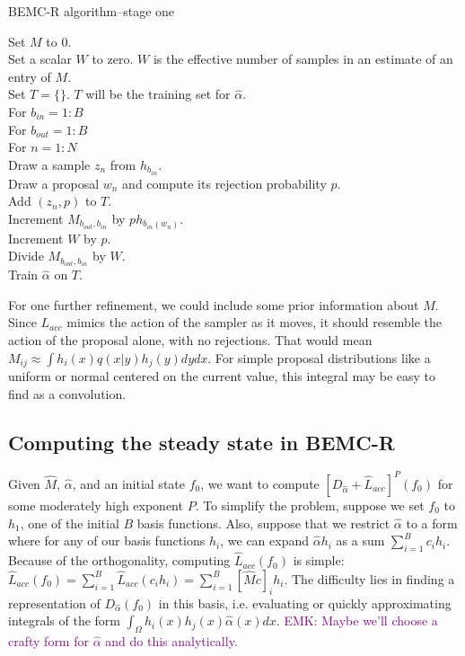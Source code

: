 \documentclass{article}
\newcommand\EMK[1]{\textcolor{purple}{EMK: #1}}
\begin{document}
\begin{algorithm}[h]
\caption{BEMC-R algorithm--stage one}
Set $M$ to $0$.\\ 
Set a scalar $W$ to zero. $W$ is the effective number of samples in an estimate of an entry of $M$.\\
Set $T = \{\}$. $T$ will be the training set for $\hat{\alpha}$.\\
For $b_{in}  = 1:B$\\
\Indp
For $b_{out}  = 1:B$\\
\Indp
For $n = 1:N$\\
\Indp
Draw a sample $z_n$ from $h_{b_{in}}$.\\
Draw a proposal $w_n$ and compute its rejection probability $p$.\\
Add $(z_n, p)$ to $T$.\\
Increment $M_{b_{out}, b_{in}}$ by $ph_{b_{in}(w_n)}$.\\
Increment $W$ by $p$.\\
\Indm
Divide $M_{b_{out}, b_{in}}$ by $W$.\\
\Indm
\Indm
Train $\hat{\alpha}$ on $T$.\\
\end{algorithm}

For one further refinement, we could include some prior information about $M$. Since $L_{acc}$ mimics the action of the sampler as it moves, it should resemble the action of the proposal alone, with no rejections. That would mean $M_{ij} \approx \int h_i(x)q(x|y)h_j(y)dydx$. For simple proposal distributions like a uniform or normal centered on the current value, this integral may be easy to find as a convolution.

\subsection{Computing the steady state in BEMC-R}
 Given $\hat{M}$, $\hat{\alpha}$, and an initial state $f_0$, we want to compute $[D_{\hat{\alpha}}+\hat{L}_{acc}]^P(f_0)$ for some moderately high exponent $P$. To simplify the problem, suppose we set $f_0$ to $h_1$, one of the initial $B$ basis functions. Also, suppose that we restrict $\hat{\alpha}$ to a form where for any of our basis functions $h_i$, we can expand $\hat{\alpha}h_i$ as a sum $\sum_{i=1}^B c_i h_i$. Because of the orthogonality, computing $\hat{L}_{acc}(f_0)$ is simple: $\hat{L}_{acc}(f_0) = \sum_{i=1}^B \hat{L}_{acc}(c_i h_i) = \sum_{i=1}^B [\hat{M}c]_i h_i$. The difficulty lies in finding a representation of $D_{\hat{\alpha}}(f_0)$ in this basis, i.e. evaluating or quickly approximating integrals of the form $\int_{\Omega} h_i(x)h_j(x)\hat{\alpha}(x)dx$. \EMK{Maybe we'll choose a crafty form for $\hat{\alpha}$ and do this analytically. }
\end{document}
